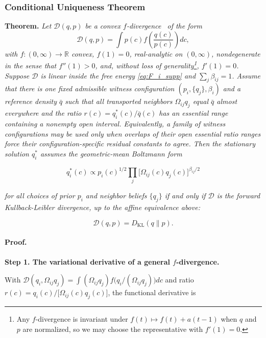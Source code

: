 \documentclass[twoside,11pt]{article}
\begin{document}
\subsubsection{Conditional Uniqueness Theorem}
\label{thm:uniqueness_supp}

\textbf{Theorem.} \textit{Let\/ $\mathcal{D}(q,p)$ be a convex $f$-divergence~\citep{Csiszar1967} of the form
\[
\mathcal{D}(q,p)
= \int p(c) f \left(\frac{q(c)}{p(c)}\right)dc,
\]
with $f:(0,\infty)\to\mathbb{R}$ convex, $f(1)=0$, real-analytic on $(0,\infty)$, nondegenerate in the sense that $f''(1)>0$, and, without loss of generality\footnote{Any $f$-divergence is invariant under $f(t)\mapsto f(t)+a(t-1)$ when $q$ and $p$ are normalized, so we may choose the representative with $f'(1)=0$.}, $f'(1)=0$. Suppose $\mathcal{D}$ is linear inside the free energy \eqref{eq:F_i_supp} and $\sum_j\beta_{ij}=1$. Assume that there is one fixed admissible witness configuration $(p_i,\{q_j\},\beta_i)$ and a reference density $\bar q$ such that all transported neighbors $\Omega_{ij}q_j$ equal $\bar q$ almost everywhere and the ratio $r(c)=q_i^*(c)/\bar q(c)$ has an essential range containing a nonempty open interval. Equivalently, a family of witness configurations may be used only when overlaps of their open essential ratio ranges force their configuration-specific residual constants to agree. Then the stationary solution $q_i^*$ assumes the geometric-mean Boltzmann form}

\begin{equation}
q_i^*(c) \propto p_i(c)^{1/2} \prod_{j}\bigl[\Omega_{ij}(c) q_j(c)\bigr]^{\beta_{ij}/2}
\label{eq:geometric_mean_target_supp}
\end{equation}

\textit{for all choices of prior $p_i$ and neighbor beliefs $\{q_j\}$ if and only if $\mathcal{D}$ is the forward Kullback-Leibler divergence, up to the affine equivalence above:}

\[
\mathcal{D}(q,p) = D_{\mathrm{KL}}(q \| p).
\]

\paragraph{Proof.}

\textbf{Step 1. The variational derivative of a general $f$-divergence.}

With $\mathcal{D}(q_i,\Omega_{ij}q_j)=\int (\Omega_{ij}q_j) f \bigl(q_i/(\Omega_{ij}q_j)\bigr) dc$ and ratio $r(c)=q_i(c)/\bigl[\Omega_{ij}(c) q_j(c)\bigr]$, the functional derivative is
\end{document}
